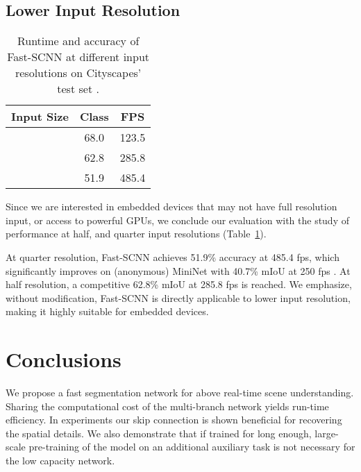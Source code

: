 \documentclass[10pt,twocolumn,letterpaper]{article}
\begin{document}
\subsection{Lower Input Resolution}
\begin{table}[tb]
\begin{center}
\begin{tabular}{l c c}
\hline
\textbf{Input Size} & \textbf{Class} & \textbf{FPS} \\
\hline
	 & 68.0 & 123.5 \\  & 62.8 & 285.8 \\  & 51.9 & 485.4 \\ \hline
\end{tabular}
\end{center}
\caption{Runtime and accuracy of Fast-SCNN at different input resolutions on Cityscapes' test set \cite{cityscaples2016}.}
\label{tbl:comparision-diff-resolutions}
\end{table}
Since we are interested in embedded devices that may not have full resolution input, or access to powerful GPUs, we conclude our evaluation with the study of performance at half, and quarter input resolutions (Table~\ref{tbl:comparision-diff-resolutions}).

At quarter resolution, Fast-SCNN achieves 51.9\% accuracy at 485.4 fps, which significantly improves on (anonymous) MiniNet with 40.7\% mIoU at 250 fps \cite{cityscaples2016}. At half resolution, a competitive 62.8\% mIoU at 285.8 fps is reached. We emphasize, without modification, Fast-SCNN is directly applicable to lower input resolution, making it highly suitable for embedded devices.


\section{Conclusions}
\label{sec:conclusions}
We propose a fast segmentation network for above real-time scene understanding. Sharing the computational cost of the multi-branch network yields run-time efficiency. In experiments our skip connection is shown beneficial for recovering the spatial details. We also demonstrate that if trained for long enough, large-scale pre-training of the model on an additional auxiliary task is not necessary for the low capacity network.


{\small


}
\end{document}
